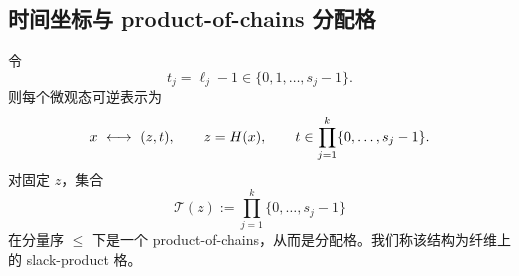\subsection{时间坐标与 product-of-chains 分配格}

令
$$
t_j=\ell_j-1\in\{0,1,\ldots,s_j-1\}.
$$
则每个微观态可逆表示为
$$
x\ \longleftrightarrow\ (z,t),\qquad z=\Head(x),\qquad t\in \prod_{j=1}^k\{0,\ldots,s_j-1\}.
$$
对固定 $z$，集合
$$
\mathcal{T}(z):=\prod_{j=1}^k\{0,\ldots,s_j-1\}
$$
在分量序 $\le$ 下是一个 product-of-chains，从而是分配格。我们称该结构为纤维上的 slack-product 格。

